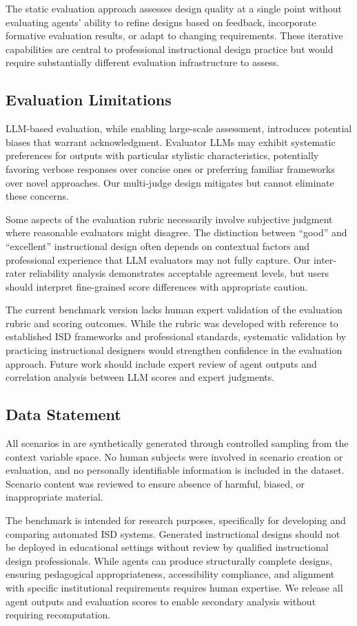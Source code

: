The static evaluation approach assesses design quality at a single point without evaluating agents' ability to refine designs based on feedback, incorporate formative evaluation results, or adapt to changing requirements. These iterative capabilities are central to professional instructional design practice but would require substantially different evaluation infrastructure to assess.

\subsection{Evaluation Limitations}

LLM-based evaluation, while enabling large-scale assessment, introduces potential biases that warrant acknowledgment. Evaluator LLMs may exhibit systematic preferences for outputs with particular stylistic characteristics, potentially favoring verbose responses over concise ones or preferring familiar frameworks over novel approaches. Our multi-judge design mitigates but cannot eliminate these concerns.

Some aspects of the evaluation rubric necessarily involve subjective judgment where reasonable evaluators might disagree. The distinction between ``good'' and ``excellent'' instructional design often depends on contextual factors and professional experience that LLM evaluators may not fully capture. Our inter-rater reliability analysis demonstrates acceptable agreement levels, but users should interpret fine-grained score differences with appropriate caution.

The current benchmark version lacks human expert validation of the evaluation rubric and scoring outcomes. While the rubric was developed with reference to established ISD frameworks and professional standards, systematic validation by practicing instructional designers would strengthen confidence in the evaluation approach. Future work should include expert review of agent outputs and correlation analysis between LLM scores and expert judgments.

\subsection{Data Statement}

All scenarios in \benchmark{} are synthetically generated through controlled sampling from the context variable space. No human subjects were involved in scenario creation or evaluation, and no personally identifiable information is included in the dataset. Scenario content was reviewed to ensure absence of harmful, biased, or inappropriate material.

The benchmark is intended for research purposes, specifically for developing and comparing automated ISD systems. Generated instructional designs should not be deployed in educational settings without review by qualified instructional design professionals. While agents can produce structurally complete designs, ensuring pedagogical appropriateness, accessibility compliance, and alignment with specific institutional requirements requires human expertise. We release all agent outputs and evaluation scores to enable secondary analysis without requiring recomputation.
